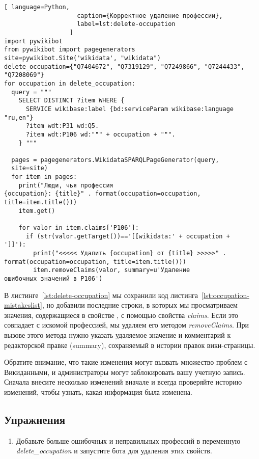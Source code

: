 \begin{lstlisting}[ language=Python,
                    caption={Корректное удаление профессии},
                    label=lst:delete-occupation
                  ]
import pywikibot
from pywikibot import pagegenerators
site=pywikibot.Site('wikidata', "wikidata")
delete_occupation={"Q7404672", "Q7319129", "Q7249866", "Q7244433", 
"Q7208069"}
for occupation in delete_occupation:
  query = """
    SELECT DISTINCT ?item WHERE {
      SERVICE wikibase:label {bd:serviceParam wikibase:language "ru,en"}
      ?item wdt:P31 wd:Q5.
      ?item wdt:P106 wd:""" + occupation + """.
    } """

  pages = pagegenerators.WikidataSPARQLPageGenerator(query, 
  site=site)
  for item in pages:
    print("Люди, чья профессия 
{occupation}: {title}" . format(occupation=occupation, 
title=item.title()))
    item.get()

    for valor in item.claims['P106']:
      if (str(valor.getTarget())=='[[wikidata:' + occupation + 
']]'):
        print("<<<<< Удалить {occupation} от {title} >>>>>" . 
format(occupation=occupation, title=item.title()))
        item.removeClaims(valor, summary=u'Удаление 
ошибочных значений в P106')
\end{lstlisting} 

В листинге~\ref{lst:delete-occupation} мы сохранили код листинга~\ref{lst:occupation-mistakeslist}, но добавили последние строки, в которых мы просматриваем значения, содержащиеся в свойстве , с помощью свойства \textit{claims}. Если это совпадает с искомой профессией, мы удаляем его методом \textit{removeClaims}. При вызове этого метода нужно указать удаляемое значение и комментарий к редакторской правке (summary), сохраняемый в истории правок вики-страницы.

Обратите внимание, что такие изменения могут вызвать множество проблем с Викиданными, и администраторы могут заблокировать вашу учетную запись. Сначала внесите несколько изменений вначале и всегда проверяйте историю изменений, чтобы узнать, какая информация была изменена.

\subsection{Упражнения}

\begin{enumerate} 
\item Добавьте больше ошибочных и неправильных профессий в переменную \textit{delete\_occupation} и запустите бота для удаления этих свойств.
\end{enumerate}
